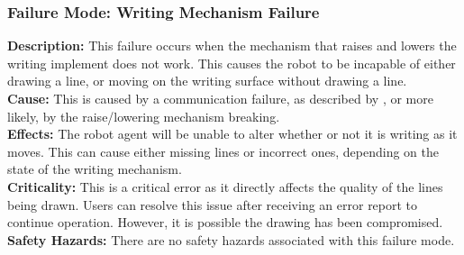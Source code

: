 \subsubsection{Failure Mode: Writing Mechanism Failure}
\label{sec:writing_fm_mechanism}
\textbf{Description:} This failure occurs when the mechanism that raises and lowers the writing implement does not work. This causes the robot to be incapable of either drawing a line, or moving on the writing surface without drawing a line.\\
\textbf{Cause:} This is caused by a communication failure, as described by , or more likely, by the raise/lowering mechanism breaking.\\
\textbf{Effects:} The robot agent will be unable to alter whether or not it is writing as it moves. This can cause either missing lines or incorrect ones, depending on the state of the writing mechanism.\\
\textbf{Criticality:} This is a critical error as it directly affects the quality of the lines being drawn. Users can resolve this issue after receiving an error report to continue operation. However, it is possible the drawing has been compromised.\\
\textbf{Safety Hazards:} There are no safety hazards associated with this failure mode.